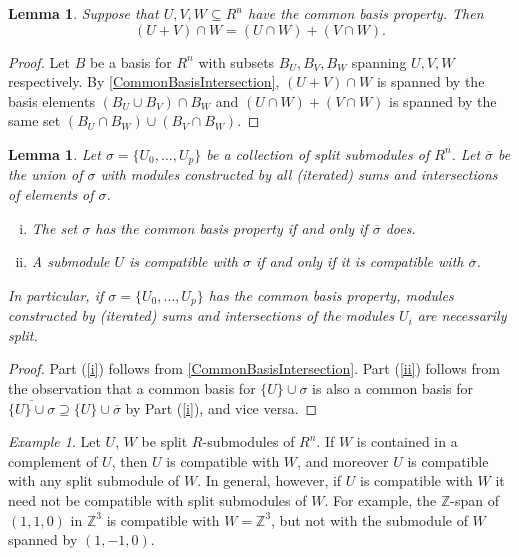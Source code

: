 \documentclass[a4paper]{amsart}
\newcommand{\Z}{\mathbb{Z}}
\numberwithin{theoremcounter}{section}
\newtheorem{lemma}[lemmaauto]{Lemma}
\theoremstyle{definition}
\theoremstyle{remark}
\newtheorem{example}[exampleauto]{Example}
\begin{document}
\begin{lemma} \label{CommonBasisIntersectionSum} Suppose that $U,V, W \subseteq R^n$ have the common basis property. Then $$(U+V) \cap W = (U \cap W) + (V \cap W).$$ 
\end{lemma} 
\begin{proof} Let $B$ be a basis for $R^n$ with subsets $B_U, B_V, B_W$ spanning $U,V,W$ respectively. By \autoref{CommonBasisIntersection}, $(U+V) \cap W$ is spanned by the basis elements $(B_U \cup B_V) \cap B_W$ and $(U \cap W) + (V \cap W)$ is spanned by the same set $(B_U \cap B_W) \cup (B_V \cap B_W)$. 
\end{proof} 

\begin{lemma} \label{CommonBasisClosure} Let $\sigma=\{U_0, \dots, U_p\}$ be a collection of split submodules of $R^n$. Let $\overline{\sigma}$ be the union of $\sigma$ with modules constructed by all (iterated) sums and intersections of elements of $\sigma$.
\begin{enumerate}[(i)]
\item \label{i}  The set  $\sigma$ has the common basis property if and only if  $\overline{\sigma}$ does. 
\item  \label{ii} A submodule $U$ is compatible with $\sigma$ if and only if it is compatible with $\overline{\sigma}$. 
\end{enumerate}
In particular, if $\sigma=\{U_0, \dots, U_p\}$ has the common basis property, modules constructed by (iterated) sums and intersections of the modules $U_i$ are necessarily split. 
\end{lemma} 

\begin{proof} Part (\ref{i}) follows from \autoref{CommonBasisIntersection}.  
 Part  (\ref{ii}) follows from the observation that a common basis for $\{U\} \cup \sigma$ is also a common basis for $\overline{\{U\} \cup \sigma} \supseteq \{U\} \cup \overline{\sigma}$  by Part (\ref{i}), and vice versa. 
\end{proof}





\begin{example} Let $U$, $W$ be split $R$-submodules of $R^n$. If $W$ is contained in a complement of $U$, then $U$ is compatible with $W$, and moreover $U$ is compatible with any split submodule of $W$. In general, however, if $U$ is compatible with $W$ it need not be compatible with split submodules of $W$. For example, the $\Z$-span of $(1, 1, 0)$ in $\Z^3$ is compatible with $W=\Z^3$, but not with the submodule of $W$ spanned by $(1, -1, 0)$. 
\end{example} 
\end{document}
